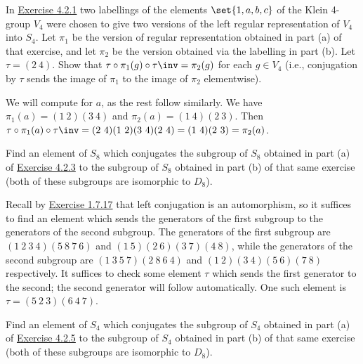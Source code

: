 \begin{exercise}
	In \hyperref[ex4.2.1]{Exercise 4.2.1} two labellings of the elements $\set{1, a, b, c}$ of the Klein 4-group $V_4$ were chosen to give two versions of the left regular representation of $V_4$ into $S_4$. Let $\pi_1$ be the version of regular representation obtained in part (a) of that exercise, and let $\pi_2$ be the version obtained via the labelling in part (b). Let $\tau = (2\ 4)$. Show that $\tau \circ \pi_1(g) \circ \tau\inv = \pi_2(g)$ for each $g \in V_4$ (i.e., conjugation by $\tau$ sends the image of $\pi_1$ to the image of $\pi_2$ elementwise).
\end{exercise}

\begin{sol}
	We will compute for $a$, as the rest follow similarly. We have $\pi_1(a) = (1\ 2)(3\ 4)$ and $\pi_2(a) = (1\ 4)(2\ 3)$. Then $\tau \circ \pi_1(a) \circ \tau\inv = (2\ 4)(1\ 2)(3\ 4)(2\ 4) = (1\ 4)(2\ 3) = \pi_2(a)$.
\end{sol}

\begin{exercise}
	Find an element of $S_8$ which conjugates the subgroup of $S_8$ obtained in part (a) of \hyperref[ex4.2.3]{Exercise 4.2.3} to the subgroup of $S_8$ obtained in part (b) of that same exercise (both of these subgroups are isomorphic to $D_8$).
\end{exercise}

\begin{sol}
	Recall by \hyperref[ex1.7.17]{Exercise 1.7.17} that left conjugation is an automorphism, so it suffices to find an element which sends the generators of the first subgroup to the generators of the second subgroup. The generators of the first subgroup are $(1\ 2\ 3\ 4)(5\ 8\ 7\ 6)$ and $(1\ 5)(2\ 6)(3\ 7)(4\ 8)$, while the generators of the second subgroup are $(1\ 3\ 5\ 7)(2\ 8\ 6\ 4)$ and $(1\ 2)(3\ 4)(5\ 6)(7\ 8)$ respectively. It suffices to check some element $\tau$ which sends the first generator to the second; the second generator will follow automatically. One such element is $\tau = (5\ 2\ 3)(6\ 4\ 7)$.
\end{sol}

\begin{exercise}
	Find an element of $S_4$ which conjugates the subgroup of $S_4$ obtained in part (a) of \hyperref[ex4.2.5]{Exercise 4.2.5} to the subgroup of $S_4$ obtained in part (b) of that same exercise (both of these subgroups are isomorphic to $D_8$).
\end{exercise}

